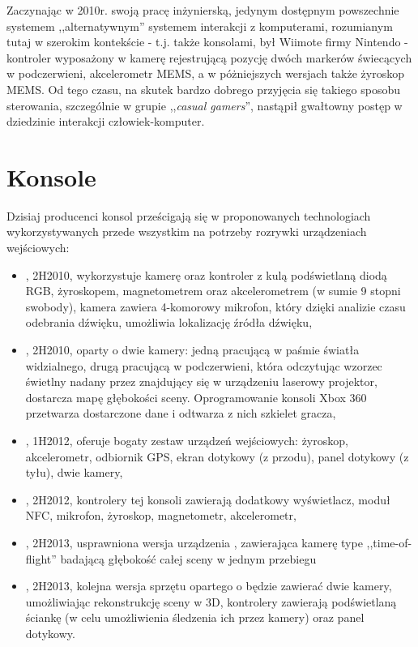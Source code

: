 \label{ch:current_state}

Zaczynając w 2010r. swoją pracę inżynierską, jedynym dostępnym powszechnie systemem ,,alternatywnym'' systemem interakcji z komputerami, rozumianym tutaj w szerokim kontekście - t.j. także konsolami, był Wiimote firmy Nintendo - kontroler wyposażony w kamerę rejestrującą pozycję dwóch markerów świecących w podczerwieni, akcelerometr MEMS, a w póżniejszych wersjach także żyroskop MEMS. Od tego czasu, na skutek bardzo dobrego przyjęcia się takiego sposobu sterowania, szczególnie w grupie ,,\textit{casual gamers}'', nastąpił gwałtowny postęp w dziedzinie interakcji człowiek-komputer.\\

\section{Konsole}

Dzisiaj producenci konsol prześcigają się w proponowanych technologiach wykorzystywanych przede wszystkim na potrzeby rozrywki urządzeniach wejściowych:
\begin{itemize}
 \item {}, 2H2010, wykorzystuje kamerę oraz kontroler z kulą podświetlaną diodą RGB, żyroskopem, magnetometrem oraz akcelerometrem (w sumie 9 stopni swobody), kamera zawiera 4-komorowy mikrofon, który dzięki analizie czasu odebrania dźwięku, umożliwia lokalizację źródła dźwięku,
 \item {}, 2H2010, oparty o dwie kamery: jedną pracującą w paśmie światła widzialnego, drugą pracującą w podczerwieni, która odczytując wzorzec świetlny nadany przez znajdujący się w urządzeniu laserowy projektor, dostarcza mapę głębokości sceny. Oprogramowanie konsoli Xbox 360 przetwarza dostarczone dane i odtwarza z nich szkielet gracza,
 \item {}, 1H2012, oferuje bogaty zestaw urządzeń wejściowych: żyroskop, akcelerometr, odbiornik GPS, ekran dotykowy (z przodu), panel dotykowy (z tyłu), dwie kamery,
 \item {}, 2H2012, kontrolery tej konsoli zawierają dodatkowy wyświetlacz, moduł NFC, mikrofon, żyroskop, magnetometr, akcelerometr,
 \item {}, 2H2013, usprawniona wersja urządzenia , zawierająca kamerę type ,,time-of-flight'' badającą głębokość całej sceny w jednym przebiegu
 \item {}, 2H2013, kolejna wersja sprzętu opartego o  będzie zawierać dwie kamery, umożliwiając rekonstrukcję sceny w 3D, kontrolery zawierają  podświetlaną ściankę (w celu umożliwienia śledzenia ich przez kamery) oraz panel dotykowy.
\end{itemize}

